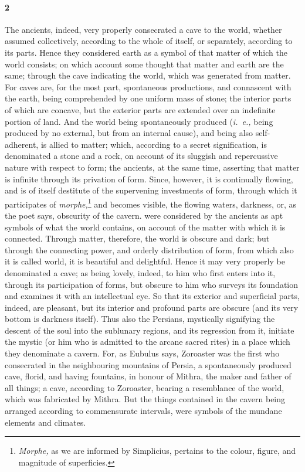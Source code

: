 \documentclass[12pt]{article}
\begin{document}
\paragraph{2} The ancients, indeed, very properly consecrated a cave to the
world, whether assumed collectively, according to the whole of itself, or
separately, according to its parts. Hence they considered earth as a symbol of
that matter of which the world consists; on which account some thought that
matter and earth are the same; through the cave indicating the world, which was
generated from matter. For caves are, for the most part, spontaneous
productions, and connascent with the earth, being comprehended by one uniform
mass of stone; the interior parts of which are concave, but the exterior parts
are extended over an indefinite portion of land. And the world being
spontaneously produced (\textit{i.~e.,} being produced by no external, but from
an internal cause), and being also self-adherent, is allied to matter; which,
according to a secret signification, is denominated a stone and a rock, on
account of its sluggish and repercussive nature with respect to form; the
ancients, at the same time, asserting that matter is infinite through its
privation of form. Since, however, it is continually flowing, and is of itself
destitute of the supervening investments of form, through which it participates
of \textit{morphe,}\footnote{\textit{Morphe,} as we are informed by Simplicius,
pertains to the colour, figure, and magnitude of superficies.} and becomes
visible, the flowing waters, darkness, or, as the poet says, obscurity of the
cavern. were considered by the ancients as apt symbols of what the world
contains, on account of the matter with which it is connected. Through matter,
therefore, the world is obscure and dark; but through the connecting power, and
orderly distribution of form, from which also it is called world, it is
beautiful and delightful. Hence it may very properly be denominated a cave; as
being lovely, indeed, to him who first enters into it, through its
participation of forms, but obscure to him who surveys its foundation and
examines it with an intellectual eye. So that its exterior and superficial
parts, indeed, are pleasant, but its interior and profound parts are obscure
(and its very bottom is darkness itself). Thus also the Persians, mystically
signifying the descent of the soul into the sublunary regions, and its
regression from it, initiate the mystic (or him who is admitted to the arcane
sacred rites) in a place which they denominate a cavern. For, as Eubulus says,
Zoroaster was the first who consecrated in the neighbouring mountains of
Persia, a spontaneously produced cave, florid, and having fountains, in honour
of Mithra, the maker and father of all things; a cave, according to Zoroaster,
bearing a resemblance of the world, which was fabricated by Mithra. But the
things contained in the cavern being arranged according to commensurate
intervals, were symbols of the mundane elements and climates.
\end{document}

